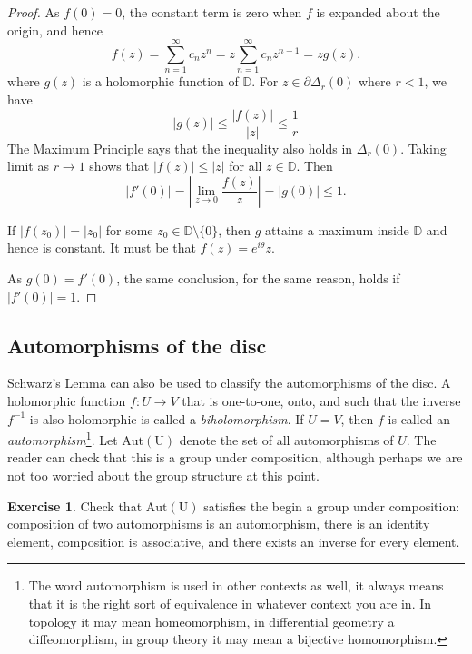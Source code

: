 \documentclass[12pt,openany]{book}
\newcommand{\sabs}[1]{\lvert {#1} \rvert}
\newcommand{\abs}[1]{\left\lvert {#1} \right\rvert}
\newcommand{\D}{{\mathbb{D}}}
\newcommand{\myindex}[1]{#1\index{#1}}
\theoremstyle{plain}
\theoremstyle{remark}
\theoremstyle{definition}
\newenvironment{exbox}{%
    \def\FrameCommand{\vrule width 1pt \relax\hspace {10pt}}%
    \MakeFramed {\advance \hsize -\width \FrameRestore }%
}{%
    \endMakeFramed
}
\theoremstyle{exercise}
\newtheorem{exercise}{Exercise}[section]
\theoremstyle{example}
\begin{document}
\begin{proof}
As $f(0) = 0$, the constant term is zero when $f$ is expanded about the
origin, and hence
\begin{equation*}
f(z) = \sum_{n=1}^\infty c_n z^n = z \sum_{n=1}^\infty c_n z^{n-1} = z g(z) .
\end{equation*}
where $g(z)$ is a holomorphic function of $\D$.  For $z \in \partial \Delta_r(0)$
where $r < 1$, we have
\begin{equation*}
\sabs{g(z)} \leq \frac{\sabs{f(z)}}{\sabs{z}} \leq \frac{1}{r}
\end{equation*}
The Maximum Principle says that the inequality also holds in $\Delta_r(0)$.
Taking limit as $r \to 1$ shows that $\sabs{f(z)} \leq \sabs{z}$ for all $z
\in \D$.  Then
\begin{equation*}
\sabs{f'(0)}
=
\abs{\lim_{z \to 0} \frac{f(z)}{z}} = \sabs{g(0)} \leq 1 .
\end{equation*}

If $\sabs{f(z_0)} = \sabs{z_0}$ for some $z_0 \in \D \setminus \{ 0 \}$,
then $g$ attains a maximum inside $\D$ and hence is constant.
It must be that $f(z) = e^{i \theta} z$.

As $g(0) = f'(0)$, the same conclusion, for the same reason,
holds if $\sabs{f'(0)} = 1$.
\end{proof}

\subsection{Automorphisms of the disc}

Schwarz's Lemma can also be used to classify the automorphisms of the disc.
A holomorphic function $f \colon U \to V$ that is one-to-one, onto, and
such that the inverse $f^{-1}$ is also holomorphic is called a
\emph{\myindex{biholomorphism}}.  If $U = V$, then $f$ is called an
\emph{\myindex{automorphism}}\footnote{%
The word automorphism is used in other contexts as well, it always means
that it is the right sort of equivalence in whatever context you are in.
In topology it may mean homeomorphism, in differential geometry a
diffeomorphism, in group theory it may mean a bijective homomorphism.}.
Let
$\operatorname{Aut(U)}$ denote the set of all automorphisms of $U$.
The reader can check that this is a group under composition,
although perhaps we are
not too worried about the group structure at this point.

\begin{exbox}
\begin{exercise}
Check that
$\operatorname{Aut(U)}$ satisfies the begin a group under composition:
composition of two automorphisms is an automorphism,
there is an identity element,
composition is associative,
and there exists an inverse for every element.
\end{exercise}
\end{exbox}
\end{document}
